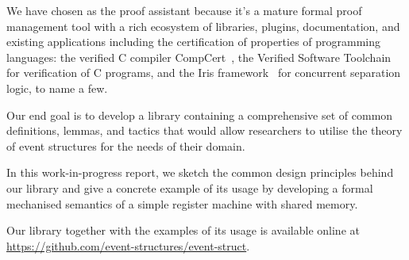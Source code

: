 We have chosen \coq as the proof assistant because it's a mature formal proof management tool
with a rich ecosystem of libraries, plugins, documentation, and
existing applications including the certification of properties of programming languages:
the verified C compiler CompCert~\cite{Leroy-Compcert-CACM:2006},
the Verified Software Toolchain~\cite{Appel-ESOP2011} for verification of C programs,
and the Iris framework~\cite{Jung-al:JFP2018} for concurrent separation logic,
to name a few.

Our end goal is to develop a \coq library containing 
a comprehensive set of common definitions, lemmas, 
and tactics that would allow researchers 
to utilise the theory of event structures 
for the needs of their domain.

In this work-in-progress report, we sketch 
the common design principles behind our library
and give a concrete example of its usage  
by developing a formal mechanised semantics of a simple 
register machine with shared memory.

Our library together with the examples of 
its usage is available online at \url{https://github.com/event-structures/event-struct}.  
